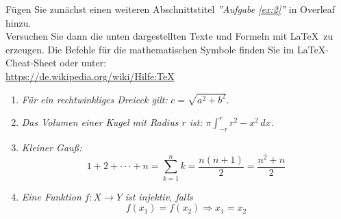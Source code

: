 \begin{ex} \label{ex:2}
Fügen Sie zunächst einen weiteren Abschnittstitel \emph{''Aufgabe \ref{ex:2}''}  in Overleaf hinzu.\\
Versuchen Sie dann die unten dargestellten Texte und Formeln mit \LaTeX\ zu erzeugen.
Die Befehle für die mathematischen Symbole finden Sie im \LaTeX -Cheat-Sheet oder unter:\\
 \url{https://de.wikipedia.org/wiki/Hilfe:TeX}
\begin{enumerate}
	\item \emph{Für ein rechtwinkliges Dreieck gilt:} $c = \sqrt{a^2+b^2}$.
	\item \emph{Das Volumen einer Kugel mit Radius $r$ ist:} $\pi\int_{-r}^{r}r^2-x^2 \,dx$.
	\item \emph{Kleiner Gauß:} \[ 1+2+\cdot \cdot \cdot +n = \sum_{k=1}^{n}k=\frac{n(n+1)}{2}=\frac{n^2+n}{2} \]
	\item \emph{Eine Funktion} $f:X \rightarrow Y$ \emph{ist injektiv, falls}
		\begin{equation}
			f(x_1)=f(x_2) \Rightarrow x_1=x_2
		\end{equation}
\end{enumerate}
\end{ex}